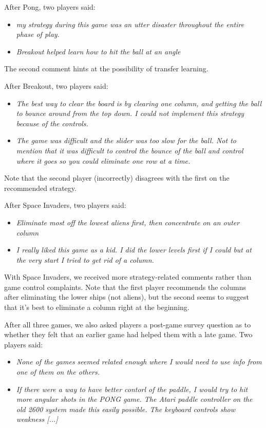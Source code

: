 \documentclass[letterpaper, 10 pt, conference]{ieeeconf}  %
\begin{document}
After Pong, two players said:

\begin{itemize}
    \item \emph{my strategy during this game was an utter disaster throughout the entire
    phase of play.}
    \item \emph{Breakout helped learn how to hit the ball at an angle}
\end{itemize}

The second comment hints at the possibility of transfer learning.

After Breakout, two players said:

\begin{itemize}
    \item \emph{The best way to clear the board is by clearing one column, and getting the ball to bounce
   around from the top down.  I could not implement this strategy because of the controls.} 
    \item \emph{The game was difficult and the slider was too slow for the ball. Not to mention that
    it was difficult to control the bounce of the ball and control where it goes so you could
    eliminate one row at a time.}
\end{itemize}

Note that the second player (incorrectly) disagrees with the first on the recommended strategy.

After Space Invaders, two players said:

\begin{itemize}
    \item \emph{Eliminate most off the lowest aliens first, then concentrate on an outer column}
    \item \emph{I really liked this game as a kid. I did the lower levels first if I could but at
    the very start I tried to get rid of a column.}
\end{itemize}

With Space Invaders, we received more strategy-related comments rather than game control complaints.
Note that the first player recommends the columns after eliminating the lower ships (not aliens),
but the second seems to suggest that it's best to eliminate a column right at the beginning.

After all three games, we also asked players a post-game survey question as to whether they felt
that an earlier game had helped them with a late game. Two players said:

\begin{itemize}
    \item \emph{None of the games seemed related enough where I would need to use info from one of
    them on the others.}
    \item \emph{If there were a way to have better contorl of the paddle, I would try to
    hit more angular shots in the PONG game. The Atari paddle controller on the old 2600 system made
    this easily possible. The keyboard controls show weakness [...]}
\end{itemize}
\end{document}
